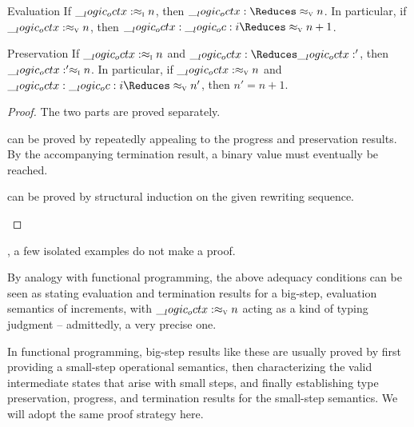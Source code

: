 \begin{corollary}
  \leavevmode
  \begin{thmdescription}
  \item[Evaluation]
    If $\__logic_octx: \approx\sb{\text{\normalfont\scshape i}} n$, then $\octx \Reduces\aval{}{n}$.
    In particular, if $\__logic_octx: \approx\sb{\text{\normalfont\scshape v}} n$, then $\octx \oc i \Reduces\aval{}{n+1}$.
  \item[Preservation]
    If $\__logic_octx: \approx\sb{\text{\normalfont\scshape i}} n$ and $\octx \Reduces \octx'$, then $\__logic_octx:' \approx\sb{\text{\normalfont\scshape i}} n$.
    In particular, if $\__logic_octx: \approx\sb{\text{\normalfont\scshape v}} n$ and $\octx \oc i \Reduces\aval{}{n'}$, then $n' = n+1$.
  \end{thmdescription}
\end{corollary}
\begin{proof}
  The two parts are proved separately.
  \begin{description}[labelsep=0.35em]
  \item[Evaluation] can be proved by repeatedly appealing to the progress and preservation results.
    By the accompanying termination result, a binary value must eventually be reached.
  \item[Preservation] can be proved by structural induction on the given rewriting sequence.
  \qedhere
  \end{description}
\end{proof}

, a few isolated examples do not make a proof.



By analogy with functional programming, the above adequacy conditions can be seen as stating evaluation and termination results for a big-step, evaluation semantics of increments, with $\__logic_octx: \approx\sb{\text{\normalfont\scshape v}} n$ acting as a kind of typing judgment -- admittedly, a very precise one.

In functional programming, big-step results like these are usually proved by first providing a small-step operational semantics, then characterizing the valid intermediate states that arise with small steps, and finally establishing type preservation, progress, and termination results for the small-step semantics.
We will adopt the same proof strategy here.

